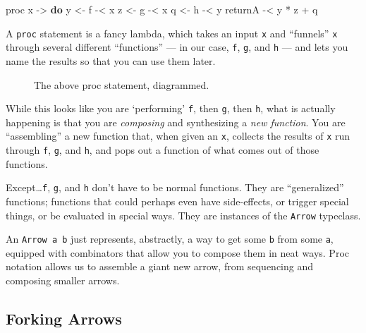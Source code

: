 \documentclass[]{article}
\newenvironment{Shaded}{}{}
\newcommand{\KeywordTok}[1]{\textcolor[rgb]{0.00,0.44,0.13}{\textbf{#1}}}
\newcommand{\NormalTok}[1]{#1}
\newcommand{\OperatorTok}[1]{\textcolor[rgb]{0.40,0.40,0.40}{#1}}
\newcommand{\OtherTok}[1]{\textcolor[rgb]{0.00,0.44,0.13}{#1}}
\begin{document}
\begin{Shaded}
\begin{Highlighting}[]
\NormalTok{proc x }\OtherTok{{-}\textgreater{}} \KeywordTok{do}
\NormalTok{    y }\OtherTok{\textless{}{-}}\NormalTok{ f }\OperatorTok{{-}\textless{}}\NormalTok{ x}
\NormalTok{    z }\OtherTok{\textless{}{-}}\NormalTok{ g }\OperatorTok{{-}\textless{}}\NormalTok{ x}
\NormalTok{    q }\OtherTok{\textless{}{-}}\NormalTok{ h }\OperatorTok{{-}\textless{}}\NormalTok{ y}
\NormalTok{    returnA }\OperatorTok{{-}\textless{}}\NormalTok{ y }\OperatorTok{*}\NormalTok{ z }\OperatorTok{+}\NormalTok{ q}
\end{Highlighting}
\end{Shaded}

A \texttt{proc} statement is a fancy lambda, which takes an input \texttt{x} and
``funnels'' \texttt{x} through several different ``functions'' --- in our case,
\texttt{f}, \texttt{g}, and \texttt{h} --- and lets you name the results so that
you can use them later.

\begin{figure}
\centering
{}
\caption{The above proc statement, diagrammed.}
\end{figure}

While this looks like you are `performing' \texttt{f}, then \texttt{g}, then
\texttt{h}, what is actually happening is that you are \emph{composing} and
synthesizing a \emph{new function}. You are ``assembling'' a new function that,
when given an \texttt{x}, collects the results of \texttt{x} run through
\texttt{f}, \texttt{g}, and \texttt{h}, and pops out a function of what comes
out of those functions.

Except\ldots{}\texttt{f}, \texttt{g}, and \texttt{h} don't have to be normal
functions. They are ``generalized'' functions; functions that could perhaps even
have side-effects, or trigger special things, or be evaluated in special ways.
They are instances of the \texttt{Arrow} typeclass.

An \texttt{Arrow\ a\ b} just represents, abstractly, a way to get some
\texttt{b} from some \texttt{a}, equipped with combinators that allow you to
compose them in neat ways. Proc notation allows us to assemble a giant new
arrow, from sequencing and composing smaller arrows.

\subsection{Forking Arrows}\label{forking-arrows}
\end{document}
